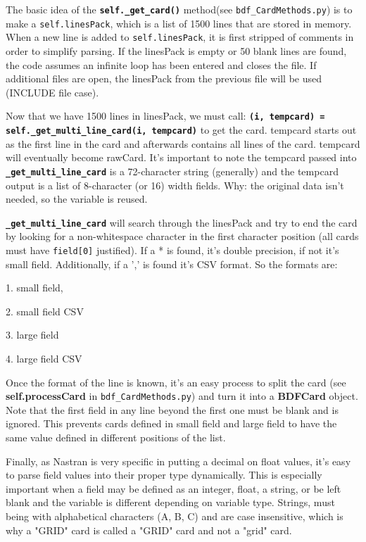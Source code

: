      The basic idea of the {\bf \tt self.\_get\_card()} method(see {\tt bdf\_CardMethods.py}) is to make a {\tt self.linesPack}, which is a list of 1500 lines that are stored in memory.  When a new line is added to {\tt self.linesPack}, it is first stripped of comments in order to simplify parsing.  If the linesPack is empty or 50 blank lines are found, the code assumes an infinite loop has been entered and closes the file.  If additional files are open, the linesPack from the previous file will be used (INCLUDE file case).
     
     Now that we have 1500 lines in linesPack, we must call:  {\bf \tt (i, tempcard) = self.\_get\_multi\_line\_card(i, tempcard)} to get the card.  tempcard starts out as the first line in the card and afterwards contains all lines of the card. tempcard will eventually become rawCard.  It's important to note the tempcard passed into {\bf \tt \_get\_multi\_line\_card} is a 72-character string (generally) and the tempcard output is a list of 8-character (or 16) width fields.  Why: the original data isn't needed, so the variable is reused.
     
     {\bf \tt \_get\_multi\_line\_card} will search through the linesPack and try to end the card by looking for a non-whitespace character in the first character position (all cards must have {\tt field[0]} justified).  If a * is found, it's double precision, if not it's small field.  Additionally, if a ',' is found it's CSV format.  So the formats are:

       1. small field,

       2. small field CSV

       3. large field

       4. large field CSV
     
     Once the format of the line is known, it's an easy process to split the card (see {\bf self.processCard} in {\tt bdf\_CardMethods.py}) and turn it into a {\bf BDFCard} object.  Note that the first field in any line beyond the first one must be blank and is ignored.  This prevents cards defined in small field and large field to have the same value defined in different positions of the list.
     
     Finally, as Nastran is very specific in putting a decimal on float values, it's easy to parse field values into their proper type dynamically.  This is especially important when a field may be defined as an integer, float, a string, or be left blank and the variable is different depending on variable type.  Strings, must being with alphabetical characters (A, B, C) and are case insensitive, which is why a "GRID" card is called a "GRID" card and not a "grid" card.
     
